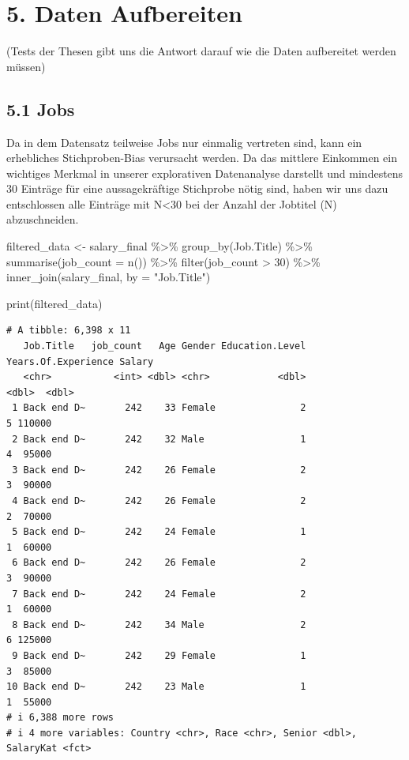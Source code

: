 \documentclass[
  letterpaper,
  DIV=11,
  numbers=noendperiod]{scrartcl}
\newenvironment{Shaded}{\begin{snugshade}}{\end{snugshade}}
\newcommand{\AttributeTok}[1]{\textcolor[rgb]{0.40,0.45,0.13}{#1}}
\newcommand{\DecValTok}[1]{\textcolor[rgb]{0.68,0.00,0.00}{#1}}
\newcommand{\FunctionTok}[1]{\textcolor[rgb]{0.28,0.35,0.67}{#1}}
\newcommand{\NormalTok}[1]{\textcolor[rgb]{0.00,0.23,0.31}{#1}}
\newcommand{\OtherTok}[1]{\textcolor[rgb]{0.00,0.23,0.31}{#1}}
\newcommand{\SpecialCharTok}[1]{\textcolor[rgb]{0.37,0.37,0.37}{#1}}
\newcommand{\StringTok}[1]{\textcolor[rgb]{0.13,0.47,0.30}{#1}}
\begin{document}
\hypertarget{daten-aufbereiten}{%
\section{5. Daten Aufbereiten}\label{daten-aufbereiten}}

(Tests der Thesen gibt uns die Antwort darauf wie die Daten aufbereitet
werden müssen)

\hypertarget{jobs}{%
\subsection{5.1 Jobs}\label{jobs}}

Da in dem Datensatz teilweise Jobs nur einmalig vertreten sind, kann ein
erhebliches Stichproben-Bias verursacht werden. Da das mittlere
Einkommen ein wichtiges Merkmal in unserer explorativen Datenanalyse
darstellt und mindestens 30 Einträge für eine aussagekräftige Stichprobe
nötig sind, haben wir uns dazu entschlossen alle Einträge mit
N\textless30 bei der Anzahl der Jobtitel (N) abzuschneiden.

\begin{Shaded}
\begin{Highlighting}[]
\NormalTok{filtered\_data }\OtherTok{\textless{}{-}}\NormalTok{ salary\_final }\SpecialCharTok{\%\textgreater{}\%}
  \FunctionTok{group\_by}\NormalTok{(Job.Title) }\SpecialCharTok{\%\textgreater{}\%}
  \FunctionTok{summarise}\NormalTok{(}\AttributeTok{job\_count =} \FunctionTok{n}\NormalTok{()) }\SpecialCharTok{\%\textgreater{}\%}
  \FunctionTok{filter}\NormalTok{(job\_count }\SpecialCharTok{\textgreater{}} \DecValTok{30}\NormalTok{) }\SpecialCharTok{\%\textgreater{}\%}
  \FunctionTok{inner\_join}\NormalTok{(salary\_final, }\AttributeTok{by =} \StringTok{"Job.Title"}\NormalTok{)}

\FunctionTok{print}\NormalTok{(filtered\_data)}
\end{Highlighting}
\end{Shaded}

\begin{verbatim}
# A tibble: 6,398 x 11
   Job.Title   job_count   Age Gender Education.Level Years.Of.Experience Salary
   <chr>           <int> <dbl> <chr>            <dbl>               <dbl>  <dbl>
 1 Back end D~       242    33 Female               2                   5 110000
 2 Back end D~       242    32 Male                 1                   4  95000
 3 Back end D~       242    26 Female               2                   3  90000
 4 Back end D~       242    26 Female               2                   2  70000
 5 Back end D~       242    24 Female               1                   1  60000
 6 Back end D~       242    26 Female               2                   3  90000
 7 Back end D~       242    24 Female               2                   1  60000
 8 Back end D~       242    34 Male                 2                   6 125000
 9 Back end D~       242    29 Female               1                   3  85000
10 Back end D~       242    23 Male                 1                   1  55000
# i 6,388 more rows
# i 4 more variables: Country <chr>, Race <chr>, Senior <dbl>, SalaryKat <fct>
\end{verbatim}
\end{document}
